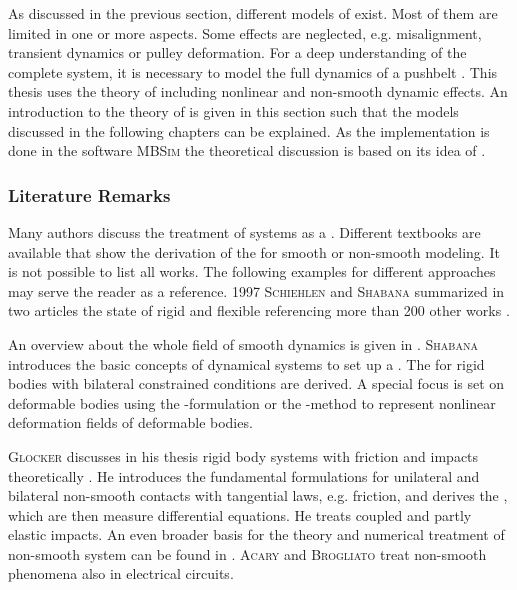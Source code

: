 As discussed in the previous section, different models of \CVTs exist. 
Most of them are limited in one or more aspects.
Some effects are neglected, e.g. misalignment, transient dynamics or pulley deformation.
For a deep understanding of the complete system, it is necessary to model the full dynamics of a pushbelt \CVT.
This thesis uses the theory of \MBS including nonlinear and non-smooth dynamic effects.  
An introduction to the theory of \MBS is given in this section such that the models discussed in the following chapters can be explained.
As the implementation is done in the software \textsc{MBSim} the theoretical discussion is based on its idea of \MBSs \cite{forg_mbsim_2015, schindler_analysing_2010}.\par

\subsubsection{Literature Remarks}

Many authors discuss the treatment of systems as a \MBS.
Different textbooks are available that show the derivation of the \EOMs for smooth or non-smooth modeling.
It is not possible to list all works.
The following examples for different approaches may serve the reader as a reference.
1997 \textsc{Schiehlen} and \textsc{Shabana} summarized in two articles the state of rigid and flexible \MBSs referencing more than 200 other works \cite{schiehlen_multibody_1997,shabana_flexible_1997}.

An overview about the whole field of smooth dynamics is given in \cite{shabana_dynamics_2005}.
\textsc{Shabana} introduces the basic concepts of dynamical systems to set up a \MBS. 
The \EOMs for rigid bodies with bilateral constrained conditions are derived.
A special focus is set on deformable bodies using the \FFR-formulation or the \ANCF-method to represent nonlinear deformation fields of deformable bodies.

\textsc{Glocker} discusses in his thesis rigid body systems with friction and impacts theoretically \cite{glocker_dynamik_1995}. 
He introduces the fundamental formulations for unilateral and bilateral non-smooth contacts with tangential laws, e.g. friction, and derives the \EOMs, which are then measure differential equations.
He treats coupled and partly elastic impacts.
An even broader basis for the theory and numerical treatment of non-smooth system can be found in \cite{acary_numerical_2008}.
\textsc{Acary} and \textsc{Brogliato} treat non-smooth phenomena also in electrical circuits.

